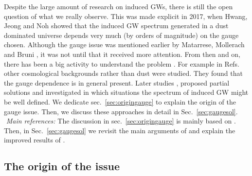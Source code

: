 \documentclass[a4paper,11pt]{article}
\numberwithin{equation}{section}
\begin{document}
Despite the large amount of research on induced GWs, there is still the open question of what we really observe. This was made explicit in 2017, when Hwang, Jeong and Noh \cite{Hwang:2017oxa} showed that the induced GW spectrum generated in a dust dominated universe depends very much (by orders of magnitude) on the gauge chosen. Although the gauge issue was mentioned earlier by Matarrese, Mollerach and Bruni \cite{Matarrese:1997ay}, it was not until \cite{Hwang:2017oxa} that it received more attention. From then and on, there has been a big activity to understand the problem \cite{Domenech:2017ems,Gong:2019mui,Tomikawa:2019tvi,DeLuca:2019ufz,Inomata:2019yww,Yuan:2019fwv,Chang:2020iji,Chang:2020tji,Lu:2020diy,Ali:2020sfw,Chang:2020mky,Domenech:2020xin,Gurian:2021rfv}. For example in Refs.~\cite{Gong:2019mui,Tomikawa:2019tvi} other cosmological backgrounds rather than dust were studied. They found that the gauge dependence is in general present. Later studies \cite{DeLuca:2019ufz,Inomata:2019yww,Yuan:2019fwv,Chang:2020iji,Chang:2020tji,Lu:2020diy,Ali:2020sfw,Chang:2020mky,Domenech:2020xin,Gurian:2021rfv}, proposed partial solutions and investigated in which situations the spectrum of induced GW might be well defined. We dedicate sec.~\ref{sec:origingauge} to explain the origin of the gauge issue. Then, we discuss these approaches in detail in Sec.~\ref{sec:gaugesol}. \\


\noindent\faBook\,\,\textit{Main references:} The discussion in sec.~\ref{sec:origingauge} is mainly based on \cite{Domenech:2017ems,Domenech:2020xin}. Then, in Sec.~\ref{sec:gaugesol} we revisit the main arguments of \cite{DeLuca:2019ufz,Inomata:2019yww} and explain the improved results of \cite{Domenech:2020xin}.

\subsection{The origin of the issue \label{sec:origingauge}}
\end{document}
